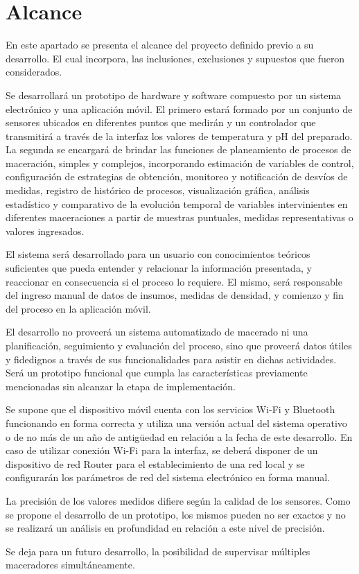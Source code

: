 \section{Alcance}
    \par
    En este apartado se presenta el alcance del proyecto definido previo a su desarrollo. El cual incorpora, las inclusiones, exclusiones y supuestos que fueron considerados.
    \par
    Se desarrollará un prototipo de hardware y software compuesto por un sistema electrónico y una aplicación móvil. El primero estará formado por un conjunto de sensores ubicados en diferentes puntos que medirán y un controlador que transmitirá a través de la interfaz los valores de temperatura y pH del preparado. La segunda se encargará de brindar las funciones de planeamiento de procesos de maceración, simples y complejos, incorporando estimación de variables de control, configuración de estrategias de obtención, monitoreo y notificación de desvíos de medidas, registro de histórico de procesos, visualización gráfica, análisis estadístico y comparativo de la evolución temporal de variables intervinientes en diferentes maceraciones a partir de muestras puntuales, medidas representativas o valores ingresados.
    \par
    El sistema será desarrollado para un usuario con conocimientos teóricos suficientes que pueda entender y relacionar la información presentada, y reaccionar en consecuencia si el proceso lo requiere. El mismo, será responsable del ingreso manual de datos de insumos, medidas de densidad, y comienzo y fin del proceso en la aplicación móvil.
    \par
    El desarrollo no proveerá un sistema automatizado de macerado ni una planificación, seguimiento y evaluación del proceso, sino que proveerá datos útiles y fidedignos a través de sus funcionalidades para asistir en dichas actividades. Será un prototipo funcional que cumpla las características previamente mencionadas sin alcanzar la etapa de implementación.
    \par
    Se supone que el dispositivo móvil cuenta con los servicios Wi-Fi y Bluetooth funcionando en forma correcta y utiliza una versión actual del sistema operativo o de no más de un año de antigüedad en relación a la fecha de este desarrollo. En caso de utilizar conexión Wi-Fi para la interfaz, se deberá disponer de un dispositivo de red Router para el establecimiento de una red local y se configurarán los parámetros de red del sistema electrónico en forma manual.
    \par
    La precisión de los valores medidos difiere según la calidad de los sensores. Como se propone el desarrollo de un prototipo, los mismos pueden no ser exactos y no se realizará un análisis en profundidad en relación a este nivel de precisión. 
    \par
    Se deja para un futuro desarrollo, la posibilidad de supervisar múltiples maceradores simultáneamente. 
 
